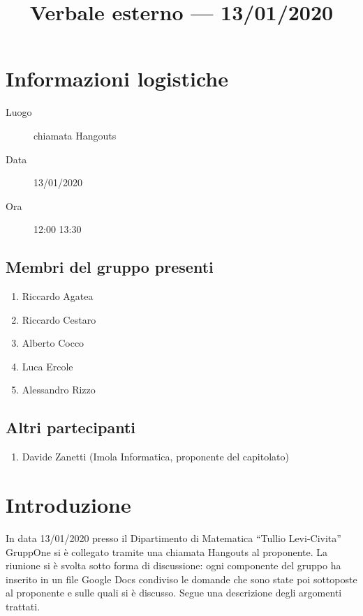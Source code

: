\documentclass{article}
\title{Verbale esterno --- 13/01/2020}
\begin{document}


\section{Informazioni logistiche}%
\label{sec:informazioni_logistiche}

\begin{description}
  \item [Luogo] chiamata Hangouts
  \item [Data] 13/01/2020
  \item [Ora] 12:00  13:30
\end{description}

\subsection{Membri del gruppo presenti}%
\label{sub:membri_del_gruppo_presenti}

\begin{enumerate}
  \item Riccardo Agatea
  \item Riccardo Cestaro
  \item Alberto Cocco
  \item Luca Ercole
  \item Alessandro Rizzo
\end{enumerate}

\subsection{Altri partecipanti}%
\label{sub:altri_partecipanti}
\begin{enumerate}
  \item Davide Zanetti (Imola Informatica, proponente del capitolato)
\end{enumerate}


\section{Introduzione}%
\label{sec:introduzione}

In data 13/01/2020 presso il Dipartimento di Matematica ``Tullio Levi-Civita'' GruppOne si è collegato tramite una chiamata Hangouts al proponente. La riunione si è svolta sotto forma di discussione: ogni componente del gruppo ha inserito in un file Google Docs condiviso le domande che sono state poi sottoposte al proponente e sulle quali si è discusso. Segue una descrizione degli argomenti trattati.
\end{document}
